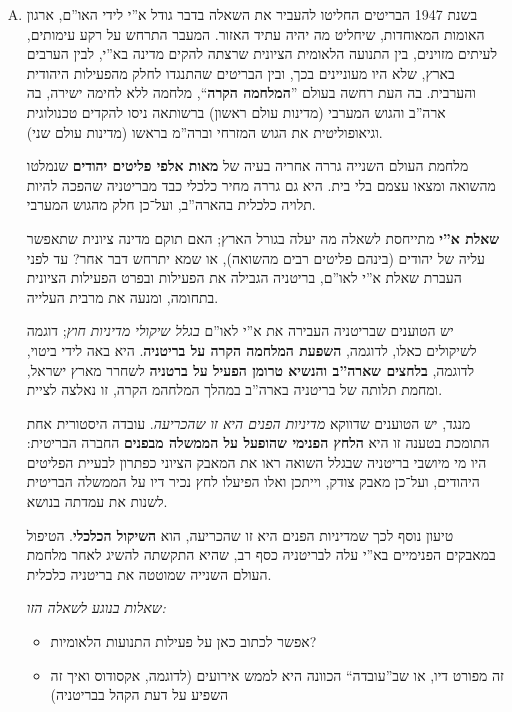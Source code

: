 \documentclass[]{../../../../tex/classes/styledArticle}
\begin{document}
	\begin{enumerate}[A.]
		\item בשנת 1947 הבריטים החליטו להעביר את השאלה בדבר גודל א''י לידי האו''ם, ארגון האומות המאוחדות, שיחליט מה יהיה עתיד האזור. המעבר התרחש על רקע עימותים, לעיתים מזוינים, בין התנועה הלאומית הציונית שרצתה להקים מדינה בא''י, לבין הערבים בארץ, שלא היו מעוניינים בכך, ובין הבריטים שהתנגדו לחלק מהפעילות היהודית והערבית. בה העת רחשה בעולם ''\textbf{המלחמה הקרה}``, מלחמה ללא לחימה ישירה, בה ארה''ב והגוש המערבי (מדינות עולם ראשון) ברשותאה ניסו להקדים טכנולוגית וגיאופוליטית את הגוש המזרחי וברה''מ בראשו (מדינות עולם שני). 
		
		מלחמת העולם השנייה גררה אחריה בעיה של \textbf{מאות אלפי פליטים יהודים} שנמלטו מהשואה ומצאו עצמם בלי בית. היא גם גררה מחיר כלכלי כבד מבריטניה שהפכה להיות תלויה כלכלית בהארה''ב, ועל־כן חלק מהגוש המערבי. 
		
		\textbf{שאלת א''י} מתייחסת לשאלה מה יעלה בגורל הארץ; האם תוקם מדינה ציונית שתאפשר עליה של יהודים (בינהם פליטים רבים מהשואה), או שמא יתרחש דבר אחר? עד לפני העברת שאלת א''י לאו''ם, בריטניה הגבילה את הפעילות ובפרט הפעילות הציונית בתחומה, ומנעה את מרבית העלייה. 
		
		יש הטוענים שבריטניה העבירה את א''י לאו''ם \textit{בגלל שיקולי מדיניות חוץ}; דוגמה לשיקולים כאלו, לדוגמה, \textbf{השפעת המלחמה הקרה על בריטניה}. היא באה לידי ביטוי, לדוגמה, \textbf{בלחצים שארה''ב והנשיא טרומן הפעיל על ברטניה} לשחרר מארץ ישראל, ומחמת תלותה של בריטניה בארה''ב במהלך המלחהמ הקרה, זו נאלצה לציית. 
		
		מנגד, יש הטוענים שדווקא \textit{מדיניות הפנים היא זו שהכריעה}. עובדה היסטורית אחת התומכת בטענה זו היא \textbf{הלחץ הפנימי שהופעל על הממשלה מבפנים} החברה הבריטית: היו מי מיושבי בריטניה שבגלל השואה ראו את המאבק הציוני כפתרון לבעיית הפליטים היהודים, ועל־כן מאבק צודק, וייתכן ואלו הפיעלו לחץ נכיר דיו על הממשלה הבריטית לשנות את עמדתה בנושא. 
		
		טיעון נוסף לכך שמדיניות הפנים היא זו שהכריעה, הוא \textbf{השיקול הכלכלי}. הטיפול במאבקים הפנימיים בא''י עלה לבריטניה כסף רב, שהיא התקשתה להשיג לאחר מלחמת העולם השנייה שמוטטה את בריטניה כלכלית. 
		
		\textit{שאלות בנוגע לשאלה הזו: }
		\begin{itemize}
			\item אפשר לכתוב כאן על פעילות התנועות הלאומיות? 
			\item זה מפורט דיו, או שב''עובדה`` הכוונה היא לממש אירועים (לדוגמה, אקסודוס ואיך זה השפיע על דעת הקהל בבריטניה)
		\end{itemize}
		

\end{enumerate}
\end{document}

